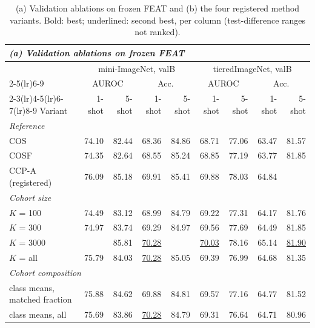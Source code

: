 \begin{table}[tbp]
\centering
\footnotesize
\setlength{\tabcolsep}{4pt}
\caption{(a) Validation ablations on frozen FEAT and (b) the four registered method variants. Bold: best; underlined: second best, per column (test-difference ranges not ranked).}\label{tab:ablations}
\begin{tabular}{lrrrrrrrr}
\multicolumn{9}{l}{\textit{(a) Validation ablations on frozen FEAT}} \\
\toprule
 & \multicolumn{4}{c}{mini-ImageNet, valB} & \multicolumn{4}{c}{tieredImageNet, valB} \\
\cmidrule(lr){2-5}\cmidrule(lr){6-9}
 & \multicolumn{2}{c}{AUROC} & \multicolumn{2}{c}{Acc.} & \multicolumn{2}{c}{AUROC} & \multicolumn{2}{c}{Acc.} \\
\cmidrule(lr){2-3}\cmidrule(lr){4-5}\cmidrule(lr){6-7}\cmidrule(lr){8-9}
Variant & 1-shot & 5-shot & 1-shot & 5-shot & 1-shot & 5-shot & 1-shot & 5-shot \\
\midrule
\multicolumn{9}{l}{\textit{Reference}} \\
\quad COS & 74.10 & 82.44 & 68.36 & 84.86 & 68.71 & 77.06 & 63.47 & 81.57 \\
\quad COSF & 74.35 & 82.64 & 68.55 & 85.24 & 68.85 & 77.19 & 63.77 & 81.85 \\
\quad CCP-A (registered) & 76.09 & 85.18 & 69.91 & 85.41 & 69.88 & 78.03 & 64.84 & \textbf{\boldmath 81.93} \\
\multicolumn{9}{l}{\textit{Cohort size}} \\
\quad $K$ = 100 & 74.49 & 83.12 & 68.99 & 84.79 & 69.22 & 77.31 & 64.17 & 81.76 \\
\quad $K$ = 300 & 74.97 & 83.74 & 69.29 & 84.97 & 69.56 & 77.69 & 64.49 & 81.85 \\
\quad $K$ = 3000 & \textbf{\boldmath 76.73} & 85.81 & \underline{70.28} & \textbf{\boldmath 85.62} & \underline{70.03} & 78.16 & 65.14 & \underline{81.90} \\
\quad $K$ = all & 75.79 & 84.03 & \underline{70.28} & 85.05 & 69.39 & 76.99 & 64.68 & 81.35 \\
\multicolumn{9}{l}{\textit{Cohort composition}} \\
\quad class means, matched fraction & 75.88 & 84.62 & 69.88 & 84.81 & 69.57 & 77.16 & 64.77 & 81.52 \\
\quad class means, all & 75.69 & 83.86 & \underline{70.28} & 84.79 & 69.31 & 76.64 & 64.71 & 80.96 \\

\end{tabular}
\end{table}
